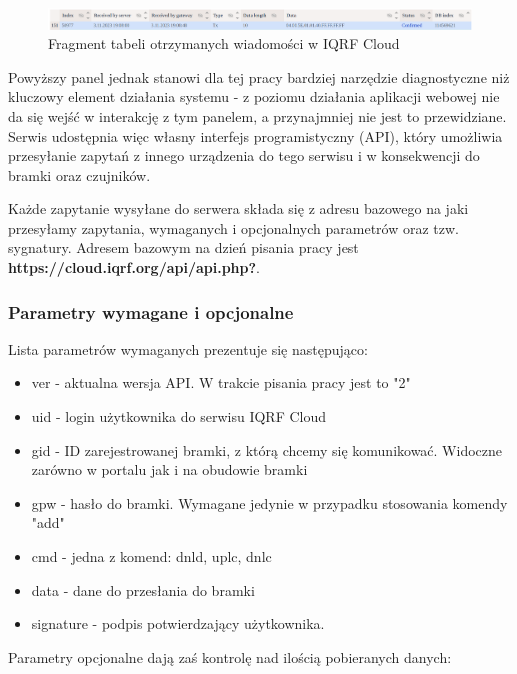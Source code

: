 \begin{figure}[H]
    \includegraphics[width=\textwidth]{zdj/cloud-records.png}
    \caption{Fragment tabeli otrzymanych wiadomości w IQRF Cloud}
\end{figure}

Powyższy panel jednak stanowi dla tej pracy bardziej narzędzie diagnostyczne niż kluczowy element działania systemu - z poziomu działania aplikacji
webowej nie da się wejść w interakcję z tym panelem, a przynajmniej nie jest to przewidziane. Serwis udostępnia więc własny interfejs 
programistyczny (API), który umożliwia przesyłanie zapytań z innego urządzenia do tego serwisu i w konsekwencji do bramki oraz czujników.

Każde zapytanie wysyłane do serwera składa się z adresu bazowego na jaki przesyłamy zapytania, wymaganych i opcjonalnych parametrów oraz tzw. 
sygnatury. Adresem bazowym na dzień pisania pracy jest \textbf{https://cloud.iqrf.org/api/api.php?}.

\subsubsection{Parametry wymagane i opcjonalne}

Lista parametrów wymaganych prezentuje się następująco:

\begin{itemize}
    \item ver - aktualna wersja API. W trakcie pisania pracy jest to "2" 
    \item uid - login użytkownika do serwisu IQRF Cloud
    \item gid - ID zarejestrowanej bramki, z którą chcemy się komunikować. Widoczne zarówno w portalu jak i na obudowie bramki
    \item gpw - hasło do bramki. Wymagane jedynie w przypadku stosowania komendy "add"
    \item cmd - jedna z komend: dnld, uplc, dnlc
    \item data - dane do przesłania do bramki
    \item signature - podpis potwierdzający użytkownika.
\end{itemize}

Parametry opcjonalne dają zaś kontrolę nad ilością pobieranych danych:

